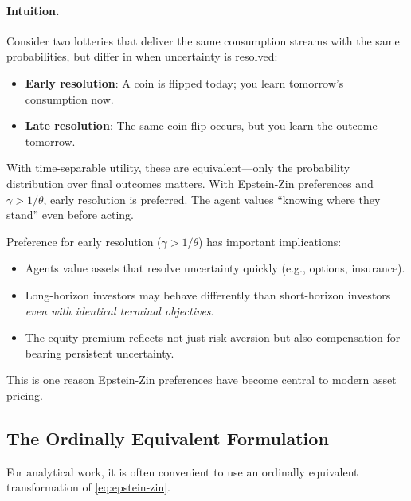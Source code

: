 \paragraph{Intuition.}

Consider two lotteries that deliver the same consumption streams with the same probabilities, but differ in when uncertainty is resolved:
\begin{itemize}[nosep]
    \item \textbf{Early resolution}: A coin is flipped today; you learn tomorrow's consumption now.
    \item \textbf{Late resolution}: The same coin flip occurs, but you learn the outcome tomorrow.
\end{itemize}

With time-separable utility, these are equivalent---only the probability distribution over final outcomes matters. With Epstein-Zin preferences and $\gamma > 1/\theta$, early resolution is preferred. The agent values ``knowing where they stand'' even before acting.

\begin{calloutimportant}
Preference for early resolution ($\gamma > 1/\theta$) has important implications:
\begin{itemize}[nosep]
    \item Agents value assets that resolve uncertainty quickly (e.g., options, insurance).
    \item Long-horizon investors may behave differently than short-horizon investors \emph{even with identical terminal objectives}.
    \item The equity premium reflects not just risk aversion but also compensation for bearing persistent uncertainty.
\end{itemize}
This is one reason Epstein-Zin preferences have become central to modern asset pricing.
\end{calloutimportant}

\subsection{The Ordinally Equivalent Formulation}
\label{subsec:ordinal-ez}

For analytical work, it is often convenient to use an ordinally equivalent transformation of \eqref{eq:epstein-zin}.

